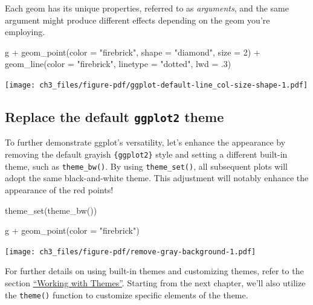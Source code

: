 \documentclass[
  letterpaper,
]{scrbook}
\newenvironment{Shaded}{\begin{snugshade}}{\end{snugshade}}
\newcommand{\AttributeTok}[1]{\textcolor[rgb]{0.40,0.45,0.13}{#1}}
\newcommand{\DecValTok}[1]{\textcolor[rgb]{0.68,0.00,0.00}{#1}}
\newcommand{\FunctionTok}[1]{\textcolor[rgb]{0.28,0.35,0.67}{#1}}
\newcommand{\NormalTok}[1]{\textcolor[rgb]{0.00,0.23,0.31}{#1}}
\newcommand{\SpecialCharTok}[1]{\textcolor[rgb]{0.37,0.37,0.37}{#1}}
\newcommand{\StringTok}[1]{\textcolor[rgb]{0.13,0.47,0.30}{#1}}
\begin{document}
Each geom has its unique properties, referred to as \emph{arguments},
and the same argument might produce different effects depending on the
geom you're employing.

\begin{Shaded}
\begin{Highlighting}[]
\NormalTok{g }\SpecialCharTok{+} \FunctionTok{geom\_point}\NormalTok{(}\AttributeTok{color =} \StringTok{"firebrick"}\NormalTok{, }\AttributeTok{shape =} \StringTok{"diamond"}\NormalTok{, }\AttributeTok{size =} \DecValTok{2}\NormalTok{) }\SpecialCharTok{+}
    \FunctionTok{geom\_line}\NormalTok{(}\AttributeTok{color =} \StringTok{"firebrick"}\NormalTok{, }\AttributeTok{linetype =} \StringTok{"dotted"}\NormalTok{, }\AttributeTok{lwd =}\NormalTok{ .}\DecValTok{3}\NormalTok{)}
\end{Highlighting}
\end{Shaded}

\texttt{[image: ch3\_files/figure-pdf/ggplot-default-line\_col-size-shape-1.pdf]}

\subsection{\texorpdfstring{Replace the default \texttt{ggplot2}
theme}{Replace the default ggplot2 theme}}\label{replace-the-default-ggplot2-theme}

To further demonstrate ggplot's versatility, let's enhance the
appearance by removing the default grayish \texttt{\{ggplot2\}} style
and setting a different built-in theme, such as \texttt{theme\_bw()}. By
using \texttt{theme\_set()}, all subsequent plots will adopt the same
black-and-white theme. This adjustment will notably enhance the
appearance of the red points!

\begin{Shaded}
\begin{Highlighting}[]
\FunctionTok{theme\_set}\NormalTok{(}\FunctionTok{theme\_bw}\NormalTok{())}

\NormalTok{g }\SpecialCharTok{+} \FunctionTok{geom\_point}\NormalTok{(}\AttributeTok{color =} \StringTok{"firebrick"}\NormalTok{)}
\end{Highlighting}
\end{Shaded}

\texttt{[image: ch3\_files/figure-pdf/remove-gray-background-1.pdf]}

For further details on using built-in themes and customizing themes,
refer to the section \hyperref[themes]{``Working with Themes''}.
Starting from the next chapter, we'll also utilize the \texttt{theme()}
function to customize specific elements of the theme.
\end{document}
